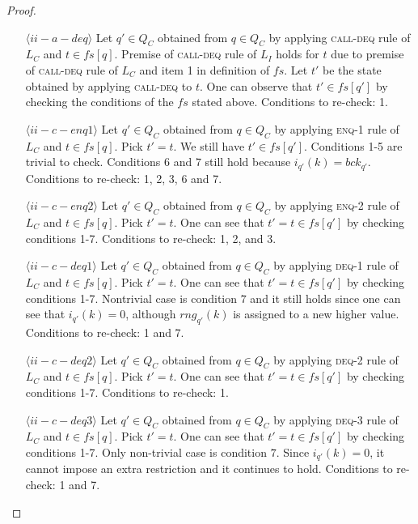 \begin{proof}
\begin{itemize}
\item[$\langle ii-a-deq \rangle$] Let $q' \in Q_C$ obtained from $q \in Q_C$ by applying \textsc{call-deq} rule of $L_C$ and $t \in fs[q]$. Premise of \textsc{call-deq} rule of $L_I$ holds for $t$ due to premise of \textsc{call-deq} rule of $L_C$ and item 1 in definition of $fs$. Let $t'$ be the state obtained by applying \textsc{call-deq} to $t$. One can observe that $t' \in fs[q']$ by checking the conditions of the $fs$ stated above. Conditions to re-check: 1.
\item[$\langle ii-c-enq1 \rangle$] Let $q' \in Q_C$ obtained from $q  \in Q_C$ by applying \textsc{enq-1} rule of $L_C$ and $t \in fs[q]$. Pick $t' = t$. We still have $t' \in fs[q']$. Conditions 1-5 are trivial to check. Conditions $6$ and $7$ still hold because $i_{q'}(k) = bck_{q'}$. Conditions to re-check: 1, 2, 3, 6 and 7.
\item[$\langle ii-c-enq2 \rangle$] Let $q' \in Q_C$ obtained from $q  \in Q_C$ by applying \textsc{enq-2} rule of $L_C$ and $t \in fs[q]$.  Pick $t' = t$. One can see that $t'=t \in fs[q']$ by checking conditions 1-7. Conditions to re-check: 1, 2, and 3.
\item[$\langle ii-c-deq1 \rangle$]Let $q' \in Q_C$ obtained from $q  \in Q_C$ by applying \textsc{deq-1} rule of $L_C$ and $t \in fs[q]$.  Pick $t' = t$. One can see that $t'=t \in fs[q']$ by checking conditions 1-7. Nontrivial case is condition $7$ and it still holds since one can see that $i_{q'}(k) =0$, although $rng_{q'}(k)$ is assigned to a new higher value. Conditions to re-check: 1 and 7.
\item[$\langle ii-c-deq2 \rangle$]Let $q' \in Q_C$ obtained from $q \in Q_C$ by applying \textsc{deq-2} rule of $L_C$ and $t \in fs[q]$.  Pick $t' = t$. One can see that $t'=t \in fs[q']$ by checking conditions 1-7. Conditions to re-check: 1.
\item[$\langle ii-c-deq3 \rangle$]Let $q' \in Q_C$ obtained from $q \in Q_C$ by applying \textsc{deq-3} rule of $L_C$ and $t \in fs[q]$.  Pick $t' = t$. One can see that $t'=t \in fs[q']$ by checking conditions 1-7. Only non-trivial case is condition $7$. Since $i_{q'}(k) = 0$, it cannot impose an extra restriction and it continues to hold. Conditions to re-check: 1 and 7.

\end{itemize}
\end{proof}

